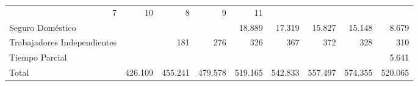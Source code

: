 \begin{tabular}{lllllllll}
  \multicolumn{1}{r}{7} &
  \multicolumn{1}{r}{10} &
  \multicolumn{1}{r}{8} &
  \multicolumn{1}{r}{9} &
  \multicolumn{1}{r}{11} \\
\multicolumn{1}{l}{\hspace{1em}Seguro Doméstico} &
  \multicolumn{1}{|r}{} &
  \multicolumn{1}{r}{} &
  \multicolumn{1}{r}{} &
  \multicolumn{1}{r}{18.889} &
  \multicolumn{1}{r}{17.319} &
  \multicolumn{1}{r}{15.827} &
  \multicolumn{1}{r}{15.148} &
  \multicolumn{1}{r}{8.679} \\
\multicolumn{1}{l}{\hspace{1em}Trabajadores Independientes} &
  \multicolumn{1}{|r}{} &
  \multicolumn{1}{r}{181} &
  \multicolumn{1}{r}{276} &
  \multicolumn{1}{r}{326} &
  \multicolumn{1}{r}{367} &
  \multicolumn{1}{r}{372} &
  \multicolumn{1}{r}{328} &
  \multicolumn{1}{r}{310} \\
\multicolumn{1}{l}{\hspace{1em}Tiempo Parcial} &
  \multicolumn{1}{|r}{} &
  \multicolumn{1}{r}{} &
  \multicolumn{1}{r}{} &
  \multicolumn{1}{r}{} &
  \multicolumn{1}{r}{} &
  \multicolumn{1}{r}{} &
  \multicolumn{1}{r}{} &
  \multicolumn{1}{r}{5.641} \\
\multicolumn{1}{l}{\hspace{1em}Total} &
  \multicolumn{1}{|r}{426.109} &
  \multicolumn{1}{r}{455.241} &
  \multicolumn{1}{r}{479.578} &
  \multicolumn{1}{r}{519.165} &
  \multicolumn{1}{r}{542.833} &
  \multicolumn{1}{r}{557.497} &
  \multicolumn{1}{r}{574.355} &
  \multicolumn{1}{r}{520.065} \\
\cline{1-9}
\end{tabular}
